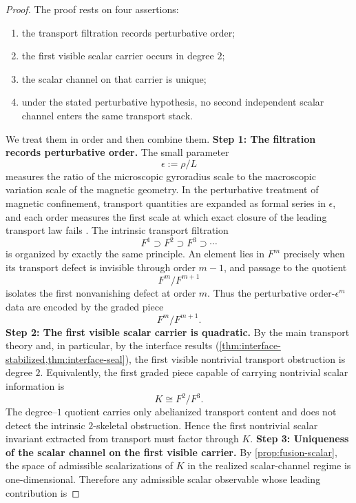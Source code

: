 \begin{proof}
	The proof rests on four assertions:
	\begin{enumerate}[label=\textup{(\arabic*)}]
		\item the transport filtration records perturbative order;
		\item the first visible scalar carrier occurs in degree \(2\);
		\item the scalar channel on that carrier is unique;
		\item under the stated perturbative hypothesis, no second independent
		      scalar channel enters the same transport stack.
	\end{enumerate}
	We treat them in order and then combine them.
	\medskip
	\noindent
	\textbf{Step 1: The filtration records perturbative order.}
	The small parameter
	\[
		\epsilon:=\rho/L
	\]
	measures the ratio of the microscopic gyroradius scale to the macroscopic
	variation scale of the magnetic geometry.
	In the perturbative treatment of magnetic confinement, transport
	quantities are expanded as formal series in \(\epsilon\), and each order
	measures the first scale at which exact closure of the leading transport
	law fails \cite{Northrop1963}.
	The intrinsic transport filtration
	\[
		F^1\supset F^2\supset F^3\supset\cdots
	\]
	is organized by exactly the same principle.
	An element lies in \(F^m\) precisely when its transport defect is
	invisible through order \(m-1\), and passage to the quotient
	\[
		F^m/F^{m+1}
	\]
	isolates the first nonvanishing defect at order \(m\).
	Thus the perturbative order-\(\epsilon^m\) data are encoded by the graded
	piece
	\[
		F^m/F^{m+1}.
	\]
	\medskip
	\noindent
	\textbf{Step 2: The first visible scalar carrier is quadratic.}
	By the main transport theory and, in particular, by the interface
	results
	(\cref{thm:interface-stabilized,thm:interface-seal}), the first visible nontrivial transport
	obstruction is degree \(2\).
	Equivalently, the first graded piece capable of carrying nontrivial
	scalar information is
	\[
		K\cong F^2/F^3.
	\]
	The degree--\(1\) quotient carries only abelianized transport content
	and does not detect the intrinsic \(2\)-skeletal obstruction.
	Hence the first nontrivial scalar invariant extracted from transport must
	factor through \(K\).
	\medskip
	\noindent
	\textbf{Step 3: Uniqueness of the scalar channel on the first visible carrier.}
	By \cref{prop:fusion-scalar}, the space of admissible scalarizations of
	\(K\) in the realized scalar-channel regime is one-dimensional.
	Therefore any admissible scalar observable whose leading contribution is

\end{proof}
